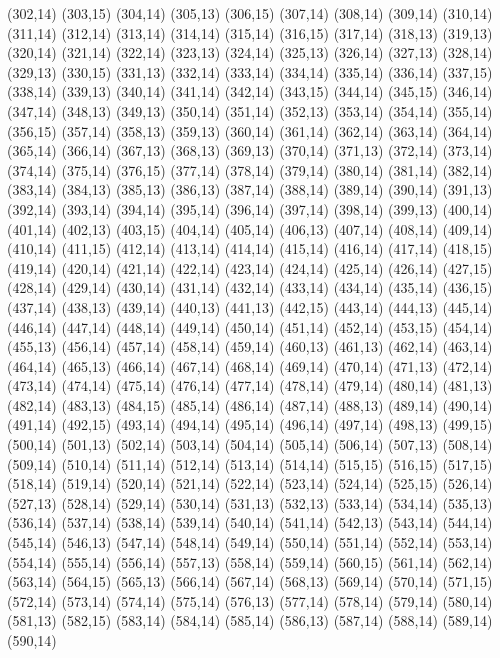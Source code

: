 (302,14)
(303,15)
(304,14)
(305,13)
(306,15)
(307,14)
(308,14)
(309,14)
(310,14)
(311,14)
(312,14)
(313,14)
(314,14)
(315,14)
(316,15)
(317,14)
(318,13)
(319,13)
(320,14)
(321,14)
(322,14)
(323,13)
(324,14)
(325,13)
(326,14)
(327,13)
(328,14)
(329,13)
(330,15)
(331,13)
(332,14)
(333,14)
(334,14)
(335,14)
(336,14)
(337,15)
(338,14)
(339,13)
(340,14)
(341,14)
(342,14)
(343,15)
(344,14)
(345,15)
(346,14)
(347,14)
(348,13)
(349,13)
(350,14)
(351,14)
(352,13)
(353,14)
(354,14)
(355,14)
(356,15)
(357,14)
(358,13)
(359,13)
(360,14)
(361,14)
(362,14)
(363,14)
(364,14)
(365,14)
(366,14)
(367,13)
(368,13)
(369,13)
(370,14)
(371,13)
(372,14)
(373,14)
(374,14)
(375,14)
(376,15)
(377,14)
(378,14)
(379,14)
(380,14)
(381,14)
(382,14)
(383,14)
(384,13)
(385,13)
(386,13)
(387,14)
(388,14)
(389,14)
(390,14)
(391,13)
(392,14)
(393,14)
(394,14)
(395,14)
(396,14)
(397,14)
(398,14)
(399,13)
(400,14)
(401,14)
(402,13)
(403,15)
(404,14)
(405,14)
(406,13)
(407,14)
(408,14)
(409,14)
(410,14)
(411,15)
(412,14)
(413,14)
(414,14)
(415,14)
(416,14)
(417,14)
(418,15)
(419,14)
(420,14)
(421,14)
(422,14)
(423,14)
(424,14)
(425,14)
(426,14)
(427,15)
(428,14)
(429,14)
(430,14)
(431,14)
(432,14)
(433,14)
(434,14)
(435,14)
(436,15)
(437,14)
(438,13)
(439,14)
(440,13)
(441,13)
(442,15)
(443,14)
(444,13)
(445,14)
(446,14)
(447,14)
(448,14)
(449,14)
(450,14)
(451,14)
(452,14)
(453,15)
(454,14)
(455,13)
(456,14)
(457,14)
(458,14)
(459,14)
(460,13)
(461,13)
(462,14)
(463,14)
(464,14)
(465,13)
(466,14)
(467,14)
(468,14)
(469,14)
(470,14)
(471,13)
(472,14)
(473,14)
(474,14)
(475,14)
(476,14)
(477,14)
(478,14)
(479,14)
(480,14)
(481,13)
(482,14)
(483,13)
(484,15)
(485,14)
(486,14)
(487,14)
(488,13)
(489,14)
(490,14)
(491,14)
(492,15)
(493,14)
(494,14)
(495,14)
(496,14)
(497,14)
(498,13)
(499,15)
(500,14)
(501,13)
(502,14)
(503,14)
(504,14)
(505,14)
(506,14)
(507,13)
(508,14)
(509,14)
(510,14)
(511,14)
(512,14)
(513,14)
(514,14)
(515,15)
(516,15)
(517,15)
(518,14)
(519,14)
(520,14)
(521,14)
(522,14)
(523,14)
(524,14)
(525,15)
(526,14)
(527,13)
(528,14)
(529,14)
(530,14)
(531,13)
(532,13)
(533,14)
(534,14)
(535,13)
(536,14)
(537,14)
(538,14)
(539,14)
(540,14)
(541,14)
(542,13)
(543,14)
(544,14)
(545,14)
(546,13)
(547,14)
(548,14)
(549,14)
(550,14)
(551,14)
(552,14)
(553,14)
(554,14)
(555,14)
(556,14)
(557,13)
(558,14)
(559,14)
(560,15)
(561,14)
(562,14)
(563,14)
(564,15)
(565,13)
(566,14)
(567,14)
(568,13)
(569,14)
(570,14)
(571,15)
(572,14)
(573,14)
(574,14)
(575,14)
(576,13)
(577,14)
(578,14)
(579,14)
(580,14)
(581,13)
(582,15)
(583,14)
(584,14)
(585,14)
(586,13)
(587,14)
(588,14)
(589,14)
(590,14)

